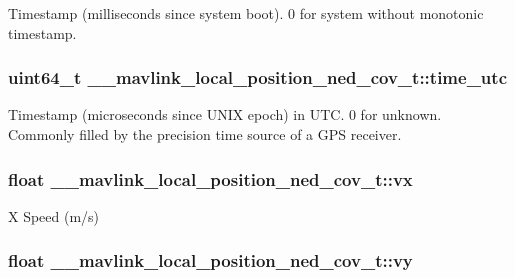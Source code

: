 Timestamp (milliseconds since system boot). 0 for system without monotonic timestamp. 

\hypertarget{struct____mavlink__local__position__ned__cov__t_a92e1d93332591f72a46739755b59dafd}{
\subsubsection[{time\+\_\+utc}]{\setlength{\rightskip}{0pt plus 5cm}uint64\+\_\+t \+\_\+\+\_\+mavlink\+\_\+local\+\_\+position\+\_\+ned\+\_\+cov\+\_\+t\+::time\+\_\+utc}}\label{struct____mavlink__local__position__ned__cov__t_a92e1d93332591f72a46739755b59dafd}


Timestamp (microseconds since U\+N\+I\+X epoch) in U\+T\+C. 0 for unknown. Commonly filled by the precision time source of a G\+P\+S receiver. 

\hypertarget{struct____mavlink__local__position__ned__cov__t_aa5a686e602e145745222107a3191750d}{
\subsubsection[{vx}]{\setlength{\rightskip}{0pt plus 5cm}float \+\_\+\+\_\+mavlink\+\_\+local\+\_\+position\+\_\+ned\+\_\+cov\+\_\+t\+::vx}}\label{struct____mavlink__local__position__ned__cov__t_aa5a686e602e145745222107a3191750d}


X Speed (m/s) 

\hypertarget{struct____mavlink__local__position__ned__cov__t_a1fcb3c458660227d4f42570d70505a3f}{
\subsubsection[{vy}]{\setlength{\rightskip}{0pt plus 5cm}float \+\_\+\+\_\+mavlink\+\_\+local\+\_\+position\+\_\+ned\+\_\+cov\+\_\+t\+::vy}}\label{struct____mavlink__local__position__ned__cov__t_a1fcb3c458660227d4f42570d70505a3f}


